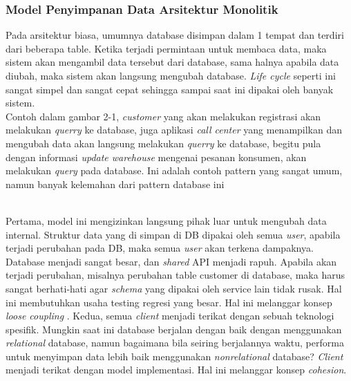 \subsubsection{Model Penyimpanan Data Arsitektur Monolitik}
Pada arsitektur biasa, umumnya database disimpan dalam 1 tempat dan terdiri dari beberapa table. Ketika terjadi permintaan untuk membaca data, maka sistem akan mengambil data tersebut dari database, sama halnya apabila data diubah, maka sistem akan langsung mengubah database. \textit{Life cycle} seperti ini sangat simpel dan sangat cepat sehingga sampai saat ini dipakai oleh banyak sistem.\\
Contoh dalam gambar 2-1, \textit{customer} yang akan melakukan registrasi akan melakukan \textit{querry} ke database, juga aplikasi \textit{call center} yang menampilkan dan mengubah data akan langsung melakukan \textit{querry} ke database, begitu pula dengan informasi \textit{update warehouse} mengenai pesanan konsumen, akan melakukan \textit{query} pada database. Ini adalah contoh pattern yang sangat umum, namun banyak kelemahan dari pattern database ini \cite{9}

\begin{adjustbox}{width=1\textwidth}
	\centering
	\begin{minipage}{\linewidth}
	\end{minipage}
\end{adjustbox}\\

Pertama, model ini mengizinkan langsung pihak luar untuk mengubah data internal. Struktur data yang di simpan di DB dipakai oleh semua \textit{user}, apabila terjadi perubahan pada DB, maka semua \textit{user} akan terkena dampaknya. Database menjadi sangat besar, dan \textit{shared} API menjadi rapuh. Apabila akan terjadi perubahan, misalnya perubahan table customer di database, maka harus sangat berhati-hati agar \textit{schema} yang dipakai oleh service lain tidak rusak. Hal ini membutuhkan usaha testing regresi yang besar. Hal ini melanggar konsep \textit{loose coupling} \cite{9}. Kedua, semua \textit{client} menjadi terikat dengan sebuah teknologi spesifik. Mungkin saat ini database berjalan dengan baik dengan menggunakan \textit{relational} database, namun bagaimana bila seiring berjalannya waktu, performa untuk menyimpan data lebih baik menggunakan \textit{nonrelational} database? \textit{Client} menjadi terikat dengan model implementasi. Hal ini melanggar konsep \textit{cohesion}.
